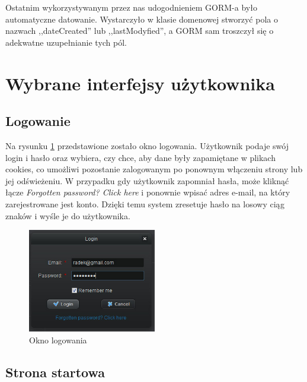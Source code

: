 \hspace{15pt}Ostatnim wykorzystywanym przez nas udogodnieniem GORM-a było automatyczne datowanie. Wystarczyło w klasie domenowej stworzyć pola o nazwach ,,dateCreated'' lub ,,lastModyfied'', a GORM sam troszczył się o adekwatne uzupełnianie tych pól.


\clearpage
\section{Wybrane interfejsy użytkownika}
\label{sec:interfejsy}


\subsection{Logowanie}
\label{sec:login}
Na rysunku \ref{fig:login} przedstawione zostało okno logowania. Użytkownik podaje swój login i hasło oraz wybiera, czy chce, aby dane były zapamiętane w plikach cookies, co umożliwi pozostanie zalogowanym po ponownym włączeniu strony lub jej odświeżeniu. W przypadku gdy użytkownik zapomniał hasła, może kliknąć łącze \emph{Forgotten password? Click here} i ponownie wpisać adres e-mail, na który zarejestrowane jest konto. Dzięki temu system zresetuje hasło na losowy ciąg znaków i wyśle je do użytkownika.
\clearpage

\begin{figure}[h!]
\centering
\includegraphics[width=0.5\textwidth]{./img/interfejsy/login2}
\caption{Okno logowania}
\label{fig:login}
\end{figure}



\subsection{Strona startowa}
\label{sec:start_page}

